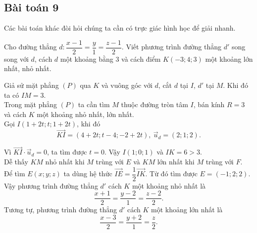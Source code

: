 \subsection{Bài toán 9}
Các bài toán khác đòi hỏi chúng ta cần có trực giác hình học để giải nhanh.
\begin{vd}%
Cho đường thẳng $d\colon\dfrac{x-1}{2}=\dfrac{y}{1}=\dfrac{z-1}{2}$. Viết phương trình đường thẳng $d'$ song song với $d$, cách $d$ một khoảng bằng $3$ và cách điểm $K(-3;4;3)$ một khoảng lớn nhất, nhỏ nhất.
\loigiai
{
\immini
{Giả sử mặt phẳng $(P)$ qua $K$ và vuông góc với $d$, cắt $d$ tại $I$, $d'$ tại $M$. Khi đó ta có $IM=3$.\\
Trong mặt phẳng $(P)$ ta cần tìm $M$ thuộc đường tròn tâm $I$, bán kính $R=3$ và cách $K$ một khoảng nhỏ nhất, lớn nhất.\\
Gọi $I(1+2t;t;1+2t)$, khi đó 
\[\vec{KI}=(4+2t;t-4;-2+2t),~\vec{u}_d=(2;1;2).\] 
\vspace{-2ex}
}
{}
\noindent Vì $\vec{KI}\cdot\vec{u}_d=0$, ta tìm được $t=0$. Vậy $I(1;0;1)$ và $IK=6>3$.\\
Dễ thấy $KM$ nhỏ nhất khi $M$ trùng với $E$ và $KM$ lớn nhất khi $M$ trùng với $F$.\\
Để tìm $E(x;y;z)$ ta dùng hệ thức $\vec{IE}=\dfrac{1}{2}\vec{IK}$. Từ đó tìm được $E=(-1;2;2).$\\
Vậy phương trình đường thẳng $d'$ cách $K$ một khoảng nhỏ nhất là
\[\dfrac{x+1}{2}=\dfrac{y-2}{1}=\dfrac{z-2}{2}.\]
Tương tự, phương trình đường thẳng $d'$ cách $K$ một khoảng lớn nhất là
\[\dfrac{x-3}{2}=\dfrac{y+2}{1}=\dfrac{z}{2}.\]

}
\end{vd}
